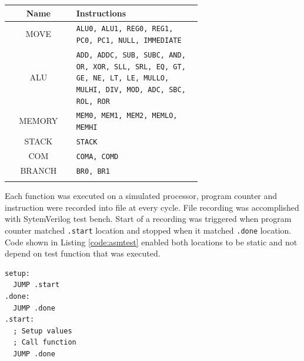 \begin{blockpage}
	\begin{tabular}{| c | p{0.65\linewidth} |} \hline 
		\rowcolor[rgb]{0.82,0.82,0.82}
		Name & Instructions \\\hline	
		\arrayrulecolor[rgb]{0.82,0.82,0.82}	
		MOVE & \texttt{ALU0, ALU1, REG0, REG1, PC0, PC1, NULL, IMMEDIATE} \\\hline
		ALU & \texttt{ADD, ADDC, SUB, SUBC,
		AND, OR, XOR, SLL,
		SRL, EQ, GT, GE, NE,
		LT, LE, MULLO, MULHI, DIV, MOD,
		ADC, SBC, ROL, ROR} \\\hline
		MEMORY & \texttt{MEM0, MEM1, MEM2, MEMLO, MEMHI} \\\hline
		STACK  & \texttt{STACK} \\\hline
		COM & \texttt{COMA, COMD} \\\hline
		BRANCH & \texttt{BR0, BR1} \\\hline
		\arrayrulecolor[rgb]{0,0,0}\hline
	\end{tabular}
	\label{tab:instr_groups_oisc_src}
\end{blockpage}

Each function was executed on a simulated processor, program counter and instruction were recorded into file at every cycle. File recording was accomplished with SytemVerilog test bench. Start of a recording was triggered when program counter matched \texttt{.start} location and stopped when it matched \texttt{.done} location. Code shown in Listing \ref{code:asmtest} enabled both locations to be static and not depend on test function that was executed.

\begin{blockpage}
	\begin{lstlisting}[frame=single, caption={Assembly frame for executring tests}, emph={setup,start,done}, label={code:asmtest}]
setup:
  JUMP .start
.done:
  JUMP .done
.start:
  ; Setup values
  ; Call function
  JUMP .done
	\end{lstlisting}
\end{blockpage}


